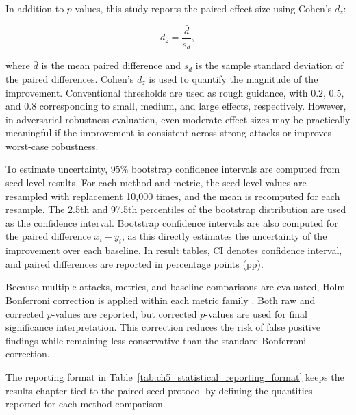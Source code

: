 In addition to $p$-values, this study reports the paired effect size using Cohen's $d_z$:

\begin{equation}
    d_z = \frac{\bar{d}}{s_d},
\end{equation}

where $\bar{d}$ is the mean paired difference and $s_d$ is the sample standard deviation of the paired differences. Cohen's $d_z$ is used to quantify the magnitude of the improvement. Conventional thresholds are used as rough guidance, with $0.2$, $0.5$, and $0.8$ corresponding to small, medium, and large effects, respectively. However, in adversarial robustness evaluation, even moderate effect sizes may be practically meaningful if the improvement is consistent across strong attacks or improves worst-case robustness.

To estimate uncertainty, 95\% bootstrap confidence intervals are computed from seed-level results. For each method and metric, the seed-level values are resampled with replacement 10{,}000 times, and the mean is recomputed for each resample. The 2.5th and 97.5th percentiles of the bootstrap distribution are used as the confidence interval. Bootstrap confidence intervals are also computed for the paired difference $x_i - y_i$, as this directly estimates the uncertainty of the improvement over each baseline. In result tables, CI denotes confidence interval, and paired differences are reported in percentage points (pp).

Because multiple attacks, metrics, and baseline comparisons are evaluated, Holm--Bonferroni correction is applied within each metric family \cite{holm1979simple}. Both raw and corrected $p$-values are reported, but corrected $p$-values are used for final significance interpretation. This correction reduces the risk of false positive findings while remaining less conservative than the standard Bonferroni correction.

The reporting format in Table~\ref{tab:ch5_statistical_reporting_format} keeps the
results chapter tied to the paired-seed protocol by defining the quantities reported
for each method comparison.

